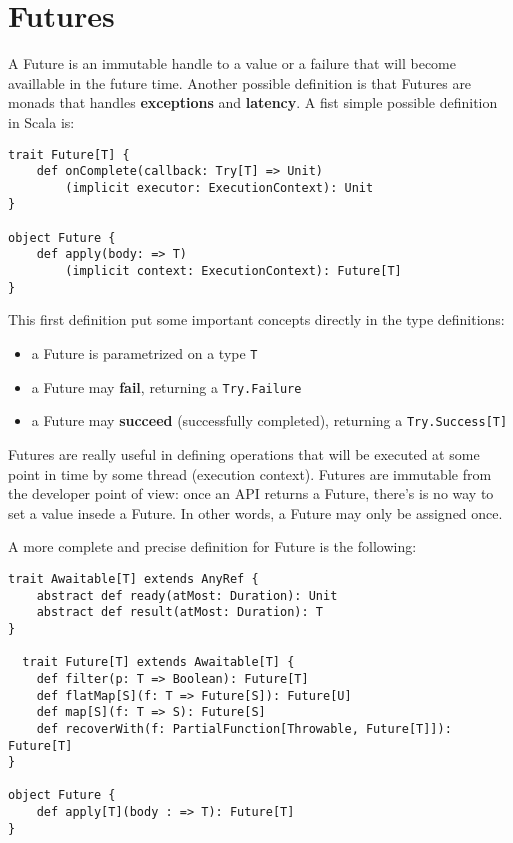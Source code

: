 \section{Futures}\label{futures}

A Future is an immutable handle to a value or a failure that will become
availlable in the future time. Another possible definition is that
Futures are monads that handles \textbf{exceptions} and
\textbf{latency}. A fist simple possible definition in Scala is:

\begin{verbatim}
trait Future[T] {
    def onComplete(callback: Try[T] => Unit)
        (implicit executor: ExecutionContext): Unit
}

object Future {
    def apply(body: => T)
        (implicit context: ExecutionContext): Future[T]
}
\end{verbatim}

This first definition put some important concepts directly in the type
definitions:

\begin{itemize}
\itemsep1pt\parskip0pt
\item
  a Future is parametrized on a type \texttt{T}
\item
  a Future may \textbf{fail}, returning a \texttt{Try.Failure}
\item
  a Future may \textbf{succeed} (successfully completed), returning a
  \texttt{Try.Success{[}T{]}}
\end{itemize}

Futures are really useful in defining operations that will be executed
at some point in time by some thread (execution context). Futures are
immutable from the developer point of view: once an API returns a
Future, there's is no way to set a value insede a Future. In other
words, a Future may only be assigned once.

A more complete and precise definition for Future is the following:

\begin{verbatim}
trait Awaitable[T] extends AnyRef {
    abstract def ready(atMost: Duration): Unit
    abstract def result(atMost: Duration): T
}

￼￼trait Future[T] extends Awaitable[T] {
    def filter(p: T => Boolean): Future[T]
    def flatMap[S](f: T => Future[S]): Future[U]
    def map[S](f: T => S): Future[S]
    def recoverWith(f: PartialFunction[Throwable, Future[T]]): Future[T]
}

object Future {
    def apply[T](body : => T): Future[T]
}
\end{verbatim}

